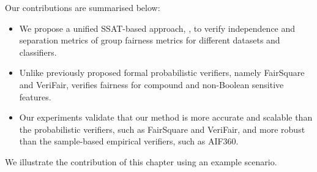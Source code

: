 
Our contributions are summarised below:
\begin{itemize}
	\item We propose a unified SSAT-based approach, {\justicia}, to verify independence and separation metrics of group  fairness metrics for different datasets and classifiers.
	\item Unlike previously proposed formal probabilistic verifiers, namely FairSquare and VeriFair, {\justicia} verifies fairness for compound and non-Boolean sensitive features.%
	\item Our experiments validate that our method is more accurate and scalable than the probabilistic verifiers, such as FairSquare and VeriFair, and more robust than the sample-based empirical verifiers, such as AIF360.
\end{itemize}



We illustrate the contribution of this chapter using an example scenario. 

